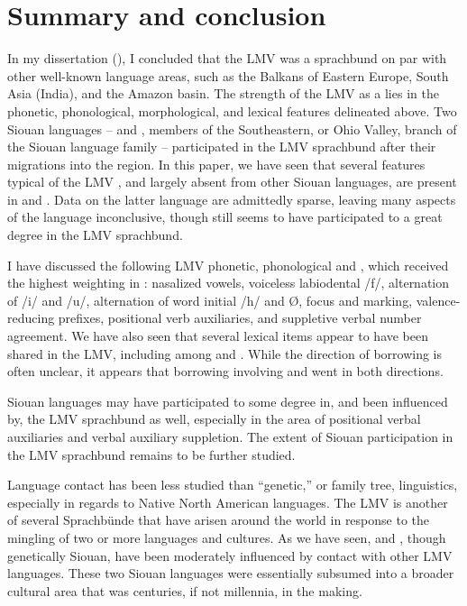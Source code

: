 \documentclass[output=paper]{LSP/langsci}
\begin{document}
\section{Summary and conclusion}
	
In my dissertation (\citealt[3]{Kaufman2014}), I concluded that the LMV was a sprachbund on par with other well-known language areas, such as the Balkans of Eastern Europe, South Asia (India), and the Amazon basin. The strength of the LMV as a  lies in the phonetic, phonological, morphological, and lexical features delineated above. Two Siouan languages --  and , members of the Southeastern, or Ohio Valley, branch of the Siouan language family -- participated in the LMV sprachbund after their migrations into the region. In this paper, we have seen that several features typical of the LMV , and largely absent from other Siouan languages, are present in  and . Data on the latter language are admittedly sparse, leaving many aspects of the language inconclusive, though  still seems to have participated to a great degree in the LMV sprachbund. 

I have discussed the following LMV phonetic, phonological and , which received the highest weighting in \citet{Kaufman2014}: nasalized vowels, voiceless labiodental  /f/, alternation of /i/ and /u/, alternation of word initial /h/ and Ø, focus and  marking, valence-reducing prefixes, positional verb auxiliaries, and suppletive verbal number agreement. We have also seen that several lexical items appear to have been shared in the LMV, including among  and . While the direction of borrowing is often unclear, it appears that borrowing involving  and  went in both directions.

 Siouan languages may have participated to some degree in, and been influenced by, the LMV sprachbund as well, especially in the area of positional verbal auxiliaries and verbal auxiliary suppletion. The extent of  Siouan participation in the LMV sprachbund remains to be further studied.

Language contact has been less studied than “genetic,” or family tree, linguistics, especially in regards to Native North American languages. The LMV is another of several Sprachbünde that have arisen around the world in response to the mingling of two or more languages and cultures. As we have seen,  and , though genetically Siouan, have been moderately influenced by contact with other LMV languages. These two Siouan languages were essentially subsumed into a broader cultural area that was centuries, if not millennia, in the making. 
\end{document}
